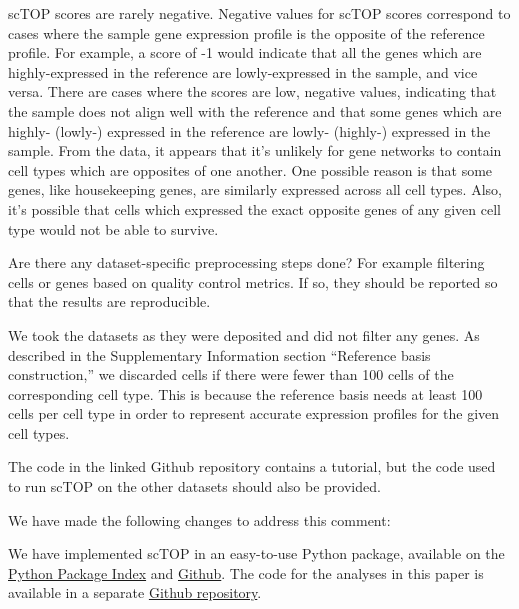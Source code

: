 \documentclass[12pt,american]{scrartcl}
\begin{document}
\begin{revresponse}
\begin{changes}
        scTOP scores are rarely negative. Negative values for scTOP scores correspond to cases where the sample gene expression profile is the opposite of the reference profile. For example, a score of -1 would indicate that all the genes which are highly-expressed in the reference are lowly-expressed in the sample, and vice versa. There are cases where the scores are low, negative values, indicating that the sample does not align well with the reference and that some genes which are highly- (lowly-) expressed in the reference are lowly- (highly-) expressed in the sample. From the data, it appears that it’s unlikely for gene networks to contain cell types which are opposites of one another. One possible reason is that some genes, like housekeeping genes, are similarly expressed across all cell types. Also, it’s possible that cells which expressed the exact opposite genes of any given cell type would not be able to survive.
    \end{changes}
\end{revresponse}

\begin{revcomment}
    Are there any dataset-specific preprocessing steps done? For example filtering cells or genes based on quality control metrics. If so, they 
should be reported so that the results are reproducible.
\end{revcomment}
\begin{revresponse}
    We took the datasets as they were deposited and did not filter any genes. As described in the Supplementary Information section ``Reference basis construction,'' we discarded cells if there were fewer than 100 cells of the corresponding cell type. This is because the reference basis needs at least 100 cells per cell type in order to represent accurate expression profiles for the given cell types.
\end{revresponse}

\begin{revcomment}
    The code in the linked Github repository contains a tutorial, but the
 code used to run scTOP on the other datasets should also be provided.
\end{revcomment}
\begin{revresponse}
    We have made the following changes to address this comment:

    \begin{changes}
        We have implemented scTOP in an easy-to-use Python package, available on the \href{https://pypi.org/project/scTOP/}{Python Package Index} and \href{https://github.com/Emergent-Behaviors-in-Biology/scTOP}{Github}. The code for the analyses in this paper is available in a separate \href{https://github.com/Emergent-Behaviors-in-Biology/scTOP-manuscript}{Github repository}.
    \end{changes}
\end{revresponse}

\printbibliography
\end{document}
